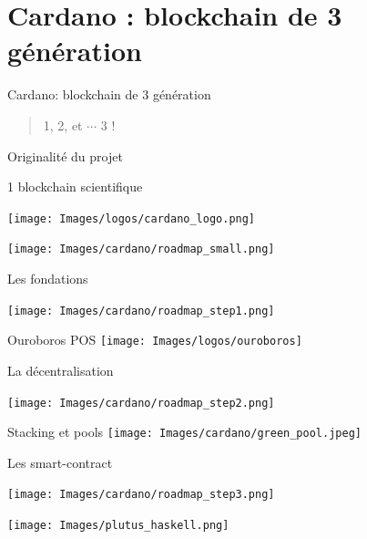 \documentclass{beamer}
\begin{document}
\section{Cardano : blockchain de 3\ieme{} génération}
\label{sec:org61221b4}
\begin{frame}[label={sec:org918e93a}]{Cardano: blockchain de 3\ieme{} génération}
  \begin{verse}
    1, 2, et \(\cdots{}\) 3 !\\
  \end{verse}
\end{frame}
\begin{frame}[label={sec:orgc83cd94}]{Originalité du projet}
  \begin{block}{1\ier{} blockchain scientifique}
    \begin{center}
      \texttt{[image: Images/logos/cardano\_logo.png]}
    \end{center}

    \begin{center}
      \texttt{[image: Images/cardano/roadmap\_small.png]}
    \end{center}
  \end{block}
\end{frame}


\begin{frame}[label={sec:orgaa015b3}]{Les fondations}
  \begin{center}
    \texttt{[image: Images/cardano/roadmap\_step1.png]}
  \end{center}

  \begin{block}{Ouroboros POS}
    \centering
    \texttt{[image: Images/logos/ouroboros]}
  \end{block}
\end{frame}

\begin{frame}[label={sec:orgc310498}]{La décentralisation}
  \begin{center}
    \texttt{[image: Images/cardano/roadmap\_step2.png]}
  \end{center}

  \begin{block}{Stacking et pools}
    \centering
    \texttt{[image: Images/cardano/green\_pool.jpeg]}
  \end{block}
\end{frame}

\begin{frame}[label={sec:org0c2e3e9}]{Les smart-contract}
  \begin{center}
    \texttt{[image: Images/cardano/roadmap\_step3.png]}
  \end{center}

  \centering
  \texttt{[image: Images/plutus\_haskell.png]}
\end{frame}
\end{document}
